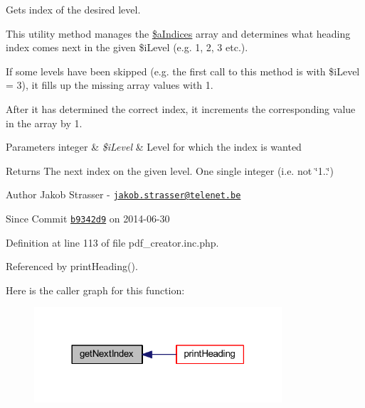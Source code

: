 Gets index of the desired level. 

This utility method manages the \hyperlink{classoverview_p_d_f_a7d055132da646af2b192923c6a864e97}{\$a\+Indices} array and determines what heading index comes next in the given {\ttfamily \$i\+Level} (e.\+g. 1, 2, 3 etc.).

If some levels have been skipped (e.\+g. the first call to this method is with {\ttfamily \$i\+Level = 3}), it fills up the missing array values with 1.

After it has determined the correct index, it increments the corresponding value in the array by 1.


\begin{DoxyParams}[1]{Parameters}
integer & {\em \$i\+Level} & Level for which the index is wanted \\
\hline
\end{DoxyParams}
\begin{DoxyReturn}{Returns}
The next index on the given level. One single integer (i.\+e. not \char`\"{}1..\char`\"{})
\end{DoxyReturn}
\begin{DoxyAuthor}{Author}
Jakob Strasser -\/ \href{mailto:jakob.strasser@telenet.be}{\tt jakob.\+strasser@telenet.\+be}
\end{DoxyAuthor}
\begin{DoxySince}{Since}
Commit \href{http://github.com/TheJake123/DrupalModul/commit/b9342d941b3f93e212f3f6af0823a07524dd5954}{\tt b9342d9} on 2014-\/06-\/30 
\end{DoxySince}


Definition at line 113 of file pdf\+\_\+creator.\+inc.\+php.



Referenced by print\+Heading().



Here is the caller graph for this function\+:
\nopagebreak
\begin{figure}[H]
\begin{center}
\leavevmode
\includegraphics[width=261pt]{classoverview_p_d_f_aedc9466cae51e07e57ba865a69c92efc_icgraph}
\end{center}
\end{figure}


